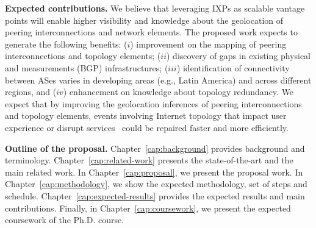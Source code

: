 	\textbf{Expected contributions.} We believe that leveraging IXPs as scalable vantage points will enable higher visibility and knowledge about the geolocation of peering interconnections and network elements. The proposed work expects to generate the following benefits: ($i$) improvement on the mapping of peering interconnections and topology elements; ($ii$) discovery of gaps in existing physical and measurements (BGP) infrastructures; ($iii$) identification of connectivity between ASes varies in developing areas (e.g., Latin America) and across different regions, and ($iv$) enhancement on knowledge about topology redundancy. We expect that by improving the geolocation inferences of peering interconnections and topology elements, events involving Internet topology that impact user experience or disrupt services~\cite{routerDMV, routerUnited, facebookCDN} could be repaired faster and more efficiently.

	\textbf{Outline of the proposal.} Chapter~\ref{cap:background} provides background and terminology. Chapter~\ref{cap:related-work} presents the state-of-the-art and the main related work. In Chapter~\ref{cap:proposal}, we present the proposal work. In Chapter~\ref{cap:methodology}, we show the expected methodology, set of steps and schedule. Chapter~\ref{cap:expected-results} provides the expected results and main contributions. Finally, in Chapter~\ref{cap:coursework}, we present the expected coursework of the Ph.D. course.


